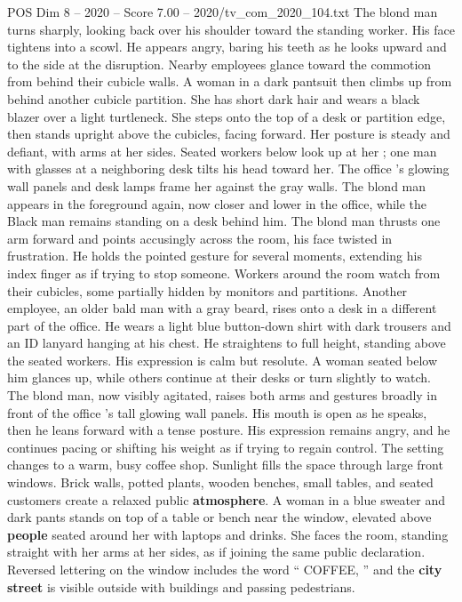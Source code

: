 \begin{textsample}{POS Dim 8 – 2020 – Score 7.00 – 2020/tv\_com\_2020\_104.txt}
The blond man turns sharply, looking back over his shoulder toward the standing worker.
His face tightens into a scowl.
He appears angry, baring his teeth as he looks upward and to the side at the disruption.
Nearby employees glance toward the commotion from behind their cubicle walls.
A woman in a dark pantsuit then climbs up from behind another cubicle partition.
She has short dark hair and wears a black blazer over a light turtleneck.
She steps onto the top of a desk or partition edge, then stands upright above the cubicles, facing forward.
Her posture is steady and defiant, with arms at her sides.
Seated workers below look up at her ; one man with glasses at a neighboring desk tilts his head toward her.
The office ’s glowing wall panels and desk lamps frame her against the gray walls.
The blond man appears in the foreground again, now closer and lower in the office, while the Black man remains standing on a desk behind him.
The blond man thrusts one arm forward and points accusingly across the room, his face twisted in frustration.
He holds the pointed gesture for several moments, extending his index finger as if trying to stop someone.
Workers around the room watch from their cubicles, some partially hidden by monitors and partitions.
Another employee, an older bald man with a gray beard, rises onto a desk in a different part of the office.
He wears a light blue button-down shirt with dark trousers and an ID lanyard hanging at his chest.
He straightens to full height, standing above the seated workers.
His expression is calm but resolute.
A woman seated below him glances up, while others continue at their desks or turn slightly to watch.
The blond man, now visibly agitated, raises both arms and gestures broadly in front of the office ’s tall glowing wall panels.
His mouth is open as he speaks, then he leans forward with a tense posture.
His expression remains angry, and he continues pacing or shifting his weight as if trying to regain control.
The setting changes to a warm, busy coffee shop.
Sunlight fills the space through large front windows.
Brick walls, potted plants, wooden benches, small tables, and seated customers create a relaxed public \textbf{atmosphere}.
A woman in a blue sweater and dark pants stands on top of a table or bench near the window, elevated above \textbf{people} seated around her with laptops and drinks.
She faces the room, standing straight with her arms at her sides, as if joining the same public declaration.
Reversed lettering on the window includes the word “ COFFEE, ” and the \textbf{city} \textbf{street} is visible outside with buildings and passing pedestrians.

\end{textsample}
